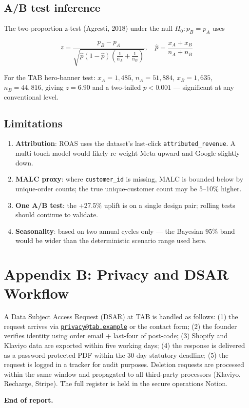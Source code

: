 \documentclass[
  11pt,
]{article}
\providecommand{\tightlist}{%
  \setlength{\itemsep}{0pt}\setlength{\parskip}{0pt}}
\begin{document}
\subsection{A/B test inference}\label{ab-test-inference-1}

The two-proportion z-test (Agresti, 2018) under the null
\(H_0: p_B = p_A\) uses

\[z = \frac{p_B - p_A}{\sqrt{\hat{p}(1-\hat{p})\left(\tfrac{1}{n_A}+\tfrac{1}{n_B}\right)}}, \quad \hat{p} = \frac{x_A + x_B}{n_A + n_B}\]

For the TAB hero-banner test: \(x_A = 1{,}485\), \(n_A = 51{,}884\),
\(x_B = 1{,}635\), \(n_B = 44{,}816\), giving \(z = 6.90\) and a
two-tailed \(p < 0.001\) --- significant at any conventional level.

\subsection{Limitations}\label{limitations}

\begin{enumerate}
\def\labelenumi{\arabic{enumi}.}
\tightlist
\item
  \textbf{Attribution}: ROAS uses the dataset's last-click
  \texttt{attributed\_revenue}. A multi-touch model would likely
  re-weight Meta upward and Google slightly down.
\item
  \textbf{MALC proxy}: where \texttt{customer\_id} is missing, MALC is
  bounded below by unique-order counts; the true unique-customer count
  may be 5--10\% higher.
\item
  \textbf{One A/B test}: the +27.5\% uplift is on a single design pair;
  rolling tests should continue to validate.
\item
  \textbf{Seasonality}: based on two annual cycles only --- the Bayesian
  95\% band would be wider than the deterministic scenario range used
  here.
\end{enumerate}

\newpage

\section{Appendix B: Privacy and DSAR
Workflow}\label{appendix-b-privacy-and-dsar-workflow}

A Data Subject Access Request (DSAR) at TAB is handled as follows: (1)
the request arrives via
\href{mailto:privacy@tab.example}{\nolinkurl{privacy@tab.example}} or
the contact form; (2) the founder verifies identity using order email +
last-four of post-code; (3) Shopify and Klaviyo data are exported within
five working days; (4) the response is delivered as a password-protected
PDF within the 30-day statutory deadline; (5) the request is logged in a
tracker for audit purposes. Deletion requests are processed within the
same window and propagated to all third-party processors (Klaviyo,
Recharge, Stripe). The full register is held in the secure operations
Notion.

\textbf{End of report.}
\end{document}
